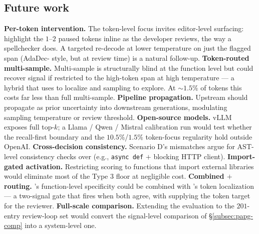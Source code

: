 \subsection{Future work}
\label{subsec:future}

\textbf{Per-token intervention.} The token-level focus invites
editor-level surfacing: highlight the $1$--$2$ paused tokens inline
as the developer reviews, the way a spellchecker does. A targeted
re-decode at lower temperature on just the flagged span (AdaDec-%
style, but at review time) is a natural follow-up.
\textbf{Token-routed multi-sample.} Multi-sample is structurally
blind at the function level but could recover signal if restricted
to the high-\eps token span at high temperature --- a hybrid that
uses \eps to localize and sampling to explore. At $\sim 1.5\%$ of
tokens this costs far less than full multi-sample.
\textbf{Pipeline propagation.} Upstream \eps should propagate as
prior uncertainty into downstream generations, modulating sampling
temperature or review threshold.
\textbf{Open-source models.} vLLM exposes full top-$k$; a Llama /
Qwen / Mistral calibration run would test whether the recall-first
boundary and the $10.5\%$/$1.5\%$ token-focus regularity hold
outside OpenAI.
\textbf{Cross-decision consistency.} Scenario D's mismatches argue
for AST-level consistency checks over \eps (e.g., \texttt{async
def} $+$ blocking HTTP client).
\textbf{Import-gated activation.} Restricting \eps scoring to
functions that import external libraries would eliminate most of
the Type 3 floor at negligible cost.
\textbf{Combined \papg $+$ \eps routing.} \papg's function-level
specificity could be combined with \eps's token localization --- a
two-signal gate that fires when both agree, with \eps supplying the
token target for the reviewer.
\textbf{Full-scale \papg comparison.} Extending the \papg evaluation
to the $201$-entry review-loop set would convert the signal-level
comparison of \S\ref{subsec:papg-comp} into a system-level one.


